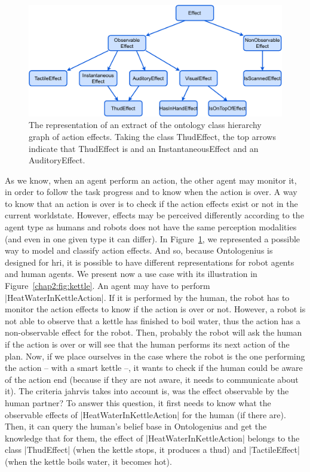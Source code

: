 \documentclass[a4paper,11pt,twoside]{StyleThese}
\begin{document}
\begin{figure}[!ht]
	\includegraphics[width=\linewidth]{figures/chapter2/class_effects.pdf}
	\caption{The representation of an extract of the ontology class hierarchy graph of action effects. Taking the class ThudEffect, the top arrows indicate that ThudEffect is and an InstantaneousEffect and an AuditoryEffect.}
	\label{chap2:fig:class_effects}
\end{figure}

As we know, when an agent perform an action, the other agent may monitor it, in order to follow the task progress and to know when the action is over. A way to know that an action is over is to check if the action effects exist or not in the current worldstate. However, effects may be perceived differently according to the agent type as humans and robots does not have the same perception modalities (and even in one given type it can differ). In Figure~\ref{chap2:fig:class_effects}, we represented a possible way to model and classify action effects. And so, because Ontologenius is designed for \acrshort{hri}, it is possible to have different representations for robot agents and human agents. We present now a use case with its illustration in Figure~\ref{chap2:fig:kettle}. An agent may have to perform |HeatWaterInKettleAction|. If it is performed by the human, the robot has to monitor the action effects to know if the action is over or not. However, a robot is not able to observe that a kettle has finished to boil water, thus the action has a non-observable effect for the robot. Then, probably the robot will ask the human if the action is over or will see that the human performs its next action of the plan. Now, if we place ourselves in the case where the robot is the one performing the action -- with a smart kettle --, it wants to check if the human could be aware of the action end (because if they are not aware, it needs to communicate about it). The criteria \acrshort{jahrvis} takes into account is, was the effect observable by the human partner? To answer this question, it first needs to know what the observable effects of |HeatWaterInKettleAction| for the human (if there are). Then, it can query the human's belief base in Ontologenius and get the knowledge that for them, the effect of |HeatWaterInKettleAction| belongs to the class |ThudEffect| (when the kettle stops, it produces a thud) and |TactileEffect| (when the kettle boils water, it becomes hot).
	
\end{document}
